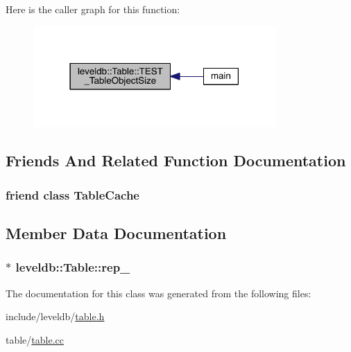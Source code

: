 Here is the caller graph for this function\+:\nopagebreak
\begin{figure}[H]
\begin{center}
\leavevmode
\includegraphics[width=262pt]{classleveldb_1_1_table_a688a3f48175793353eb24bdbe6e00040_icgraph}
\end{center}
\end{figure}




\subsection{Friends And Related Function Documentation}
\hypertarget{classleveldb_1_1_table_ae1e5f7bae4682672cfcc68d0add43199}{}
\subsubsection[{Table\+Cache}]{\setlength{\rightskip}{0pt plus 5cm}friend class {\bf Table\+Cache}\hspace{0.3cm}{\ttfamily [friend]}}\label{classleveldb_1_1_table_ae1e5f7bae4682672cfcc68d0add43199}


\subsection{Member Data Documentation}
\hypertarget{classleveldb_1_1_table_a5f452efeff7114793e2943215d4c6121}{}
\subsubsection[{rep\+\_\+}]{$\ast$ leveldb\+::\+Table\+::rep\+\_\+\hspace{0.3cm}{\ttfamily [private]}}\label{classleveldb_1_1_table_a5f452efeff7114793e2943215d4c6121}


The documentation for this class was generated from the following files\+:\begin{DoxyCompactItemize}
\item 
include/leveldb/\hyperlink{table_8h}{table.\+h}\item 
table/\hyperlink{table_8cc}{table.\+cc}\end{DoxyCompactItemize}
